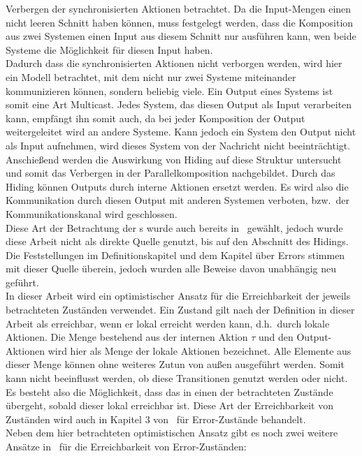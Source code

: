 Verbergen der synchronisierten Aktionen betrachtet. Da die Input-Mengen einen
nicht leeren Schnitt haben können, muss festgelegt werden, dass die Komposition
aus zwei Systemen einen Input aus diesem Schnitt nur ausführen kann, wen beide
Systeme die Möglichkeit für diesen Input haben.\\
Dadurch dass die synchronisierten Aktionen nicht verborgen werden, wird hier
ein Modell betrachtet, mit dem nicht nur zwei Systeme miteinander kommunizieren können,
sondern beliebig viele. Ein Output eines Systems ist somit eine Art Multicast.
Jedes System, das diesen Output als Input verarbeiten kann, empfängt ihn somit auch,
da bei jeder Komposition der Output weitergeleitet wird an andere Systeme.
Kann jedoch ein System den Output nicht als Input aufnehmen, wird dieses System von
der Nachricht nicht beeinträchtigt.\\
Anschießend werden die Auswirkung von Hiding auf diese Struktur
untersucht und somit das Verbergen in der Parallelkomposition nachgebildet.
Durch das Hiding können Outputs durch interne Aktionen ersetzt werden. Es wird
also die Kommunikation durch diesen Output mit anderen Systemen verboten, bzw.\
der Kommunikationskanal wird geschlossen.\\
Diese Art der Betrachtung der
\EIO{}s wurde auch bereits in~\cite{Schlosser2012BA} gewählt, jedoch wurde
diese Arbeit nicht als direkte Quelle genutzt, bis auf den Abschnitt des
Hidings. Die Feststellungen im Definitionskapitel und dem Kapitel über
Errors stimmen mit dieser Quelle überein, jedoch wurden alle Beweise davon unabhängig neu
geführt.\\
In dieser Arbeit wird ein optimistischer Ansatz für die Erreichbarkeit
der jeweils betrachteten Zuständen verwendet. Ein Zustand gilt nach der Definition in dieser
Arbeit als erreichbar, wenn er lokal erreicht
werden kann, d.h.\ durch lokale Aktionen. Die Menge bestehend aus der internen
Aktion $\tau$ und den Output-Aktionen wird hier als Menge der lokale Aktionen
bezeichnet.
Alle Elemente aus dieser Menge können ohne weiteres Zutun von außen ausgeführt
werden. Somit kann nicht beeinflusst werden, ob diese Transitionen genutzt
werden oder nicht. Es besteht also die Möglichkeit, dass das \EIO{} in einen
der betrachteten Zustände übergeht, sobald dieser lokal erreichbar ist. Diese Art der
Erreichbarkeit von Zuständen wird auch in Kapitel 3 von~\cite{Vogler2014EIO}
für Error-Zustände behandelt.\\
Neben dem hier betrachteten optimistischen Ansatz gibt es noch zwei weitere
Ansätze in~\cite{Vogler2014EIO} für die Erreichbarkeit von Error-Zuständen:
